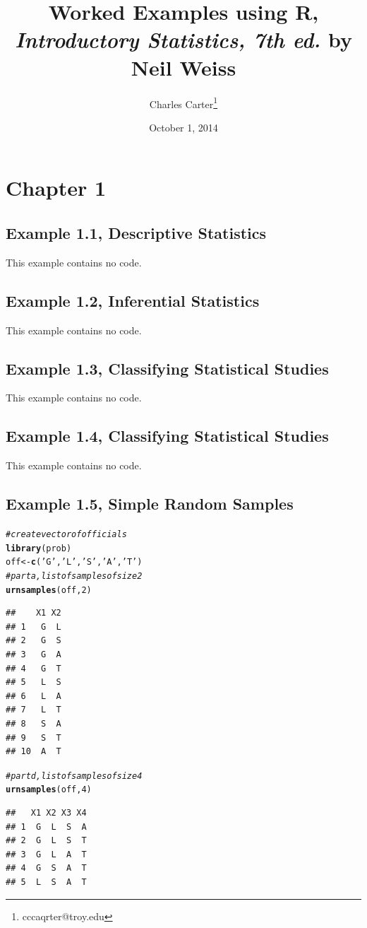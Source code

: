 \documentclass{article}\usepackage[]{graphicx}\usepackage[]{color}
\title{Worked Examples using \textsf{R}, \textit{Introductory Statistics, 7th ed.} by Neil Weiss}
\author{Charles Carter\thanks{cccaqrter@troy.edu}}
\date{October 1, 2014}
\makeatletter
\newcommand{\hlnum}[1]{\textcolor[rgb]{0.686,0.059,0.569}{#1}}%
\newcommand{\hlstr}[1]{\textcolor[rgb]{0.192,0.494,0.8}{#1}}%
\newcommand{\hlcom}[1]{\textcolor[rgb]{0.678,0.584,0.686}{\textit{#1}}}%
\newcommand{\hlstd}[1]{\textcolor[rgb]{0.345,0.345,0.345}{#1}}%
\newcommand{\hlkwb}[1]{\textcolor[rgb]{0.69,0.353,0.396}{#1}}%
\newcommand{\hlkwd}[1]{\textcolor[rgb]{0.737,0.353,0.396}{\textbf{#1}}}%
\newenvironment{kframe}{%
 \def\at@end@of@kframe{}%
 \ifinner\ifhmode%
  \def\at@end@of@kframe{\end{minipage}}%
  \begin{minipage}{\columnwidth}%
 \fi\fi%
 \def\FrameCommand##1{\hskip\@totalleftmargin \hskip-\fboxsep
 \colorbox{shadecolor}{##1}\hskip-\fboxsep
     \hskip-\linewidth \hskip-\@totalleftmargin \hskip\columnwidth}%
 \MakeFramed {\advance\hsize-\width
   \@totalleftmargin\z@ \linewidth\hsize
   \@setminipage}}%
 {\par\unskip\endMakeFramed%
 \at@end@of@kframe}
\newenvironment{knitrout}{}{} %
\makeatother
\begin{document}
\maketitle{}
\tableofcontents{}


\section{Chapter 1}

\subsection{Example 1.1, Descriptive Statistics}This example contains no code.
\subsection{Example 1.2, Inferential Statistics}This example contains no code.
\subsection{Example 1.3, Classifying Statistical Studies}This example contains no code.
\subsection{Example 1.4, Classifying Statistical Studies}This example contains no code.
\subsection{Example 1.5, Simple Random Samples}

\begin{knitrout}
\color{fgcolor}\begin{kframe}
\begin{alltt}
\hlcom{#create vector of officials}
\hlkwd{library}\hlstd{(prob)}
\hlstd{off} \hlkwb{<-} \hlkwd{c}\hlstd{(}\hlstr{'G'}\hlstd{,} \hlstr{'L'}\hlstd{,} \hlstr{'S'}\hlstd{,} \hlstr{'A'}\hlstd{,} \hlstr{'T'}\hlstd{)}
\hlcom{#part a, list of samples of size 2}
\hlkwd{urnsamples}\hlstd{(off,} \hlnum{2}\hlstd{)}
\end{alltt}
\begin{verbatim}
##    X1 X2
## 1   G  L
## 2   G  S
## 3   G  A
## 4   G  T
## 5   L  S
## 6   L  A
## 7   L  T
## 8   S  A
## 9   S  T
## 10  A  T
\end{verbatim}
\begin{alltt}
\hlcom{#part d, list of samples of size 4}
\hlkwd{urnsamples}\hlstd{(off,} \hlnum{4}\hlstd{)}
\end{alltt}
\begin{verbatim}
##   X1 X2 X3 X4
## 1  G  L  S  A
## 2  G  L  S  T
## 3  G  L  A  T
## 4  G  S  A  T
## 5  L  S  A  T
\end{verbatim}
\end{kframe}
\end{knitrout}
\end{document}
